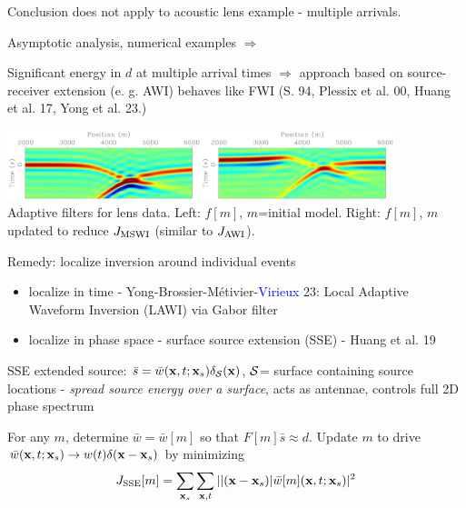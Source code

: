 \documentclass[xcolor=dvipsnames,12pt,aspectratio=169]{beamer}
\begin{document}
\begin{frame}
  Conclusion does not apply to acoustic lens example - multiple
  arrivals.

  Asymptotic analysis, numerical examples $\Rightarrow$

  Significant energy in $d$ at multiple arrival times $\Rightarrow$
  approach based on source-receiver extension (e. g. AWI) behaves like
  FWI (S. 94, Plessix et al. 00, Huang et al. 17, Yong et al. 23.)

\begin{center}
\hspace{-0.5in}\includegraphics[height=0.8in]{Fig/uest0wind.pdf}\includegraphics[height=0.8in]{Fig/uestmswiwind.pdf}\\

Adaptive filters for lens data. Left: $f[m]$, $m$=initial model. Right: $f[m]$, $m$ updated to reduce
$J_{\rm MSWI}$ (similar to $J_{\rm AWI}$).
\end{center}
\end{frame}

\begin{frame}
  Remedy: localize inversion around individual events

  \begin{itemize}
  \item localize in time - Yong-Brossier-Métivier-\textcolor{blue}{Virieux} 23: Local
    Adaptive Waveform Inversion (LAWI) via Gabor filter
  \item localize in phase space - surface source extension (SSE) -
    Huang et al. 19
  \end{itemize}

  SSE extended source: $\bar{s} = \bar{w}(\mathbf{x},t;\mathbf{x}_s)\delta_{{\cal
      S}}(\mathbf{x})$, ${\cal S} $= surface containing source locations -
  {\em spread source energy over a surface}, acts as antennae,
  controls full 2D phase spectrum

For any $m$, determine $\bar{w}=\bar{w}[m]$ so that $F[m]\bar{s} \approx d$. Update $m$ to drive
$\bar{w}(\mathbf{x},t;\mathbf{x}_s) \rightarrow w(t)\delta(\mathbf{x}-\mathbf{x}_s)$ by minimizing
\[
  J_{\rm SSE}[m] = \sum_{\mathbf{x}_s}\sum_{\mathbf{x},t} ||(\mathbf{x}-\mathbf{x}_s)|
  \bar{w}[m](\mathbf{x},t;\mathbf{x}_s)|^2
 \]
\end{frame}
\end{document}
